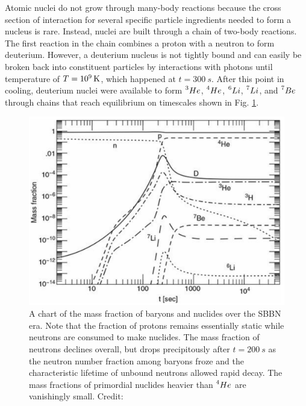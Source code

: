 \documentclass{paper}
\begin{document}
  Atomic nuclei do not grow through many-body reactions 
  because the cross section of interaction for several specific particle
  ingredients needed to form a nucleus is rare. Instead, nuclei are built
  through a chain of two-body reactions. The first reaction in the chain
  combines a proton with a neutron to form deuterium. However, a deuterium
  nucleus is not tightly bound and can easily be broken back into constituent
  particles by interactions with photons until temperature of
  \(T = \SI{E9}{K}\), which happened at \(t = \SI{300}{s}\). After this point in cooling, 
  deuterium nuclei were available to form \(\prescript{3}{}{He}\), 
  \(\prescript{4}{}{He}\), \(\prescript{6}{}{Li}\), \(\prescript{7}{}{Li}\), 
  and \(\prescript{7}{}{Be}\) through chains that reach equilibrium on
  timescales shown in Fig. \ref{fig:BBN-frac}.

  \begin{figure}[H]
    \begin{centering}
    \includegraphics[scale=0.3]{BBN-frac.pdf}
    \caption{A chart of the mass fraction of baryons and nuclides over the
      SBBN era. Note that the fraction of protons remains essentially static
      while neutrons are consumed to make nuclides. The mass fraction of 
      neutrons declines overall, but drops precipitously after 
      \(t = \SI{200}{s}\) as the neutron number fraction among baryons froze 
      and the characteristic lifetime of unbound neutrons allowed rapid decay.
      The mass fractions of primordial nuclides heavier than 
      \(\prescript{4}{}{He}\) are vanishingly small.
    Credit: \cite{ryden2003introduction}}
    \label{fig:BBN-frac}
    \end{centering}
  \end{figure}
\end{document}
